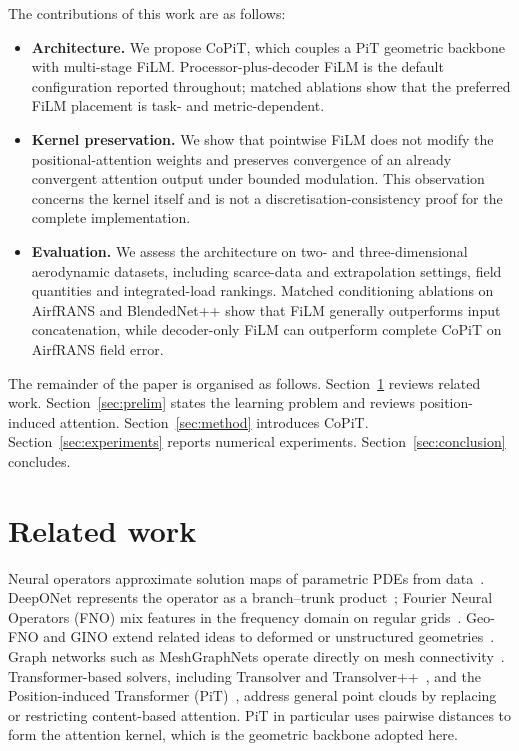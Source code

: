 \documentclass[final,3p,times]{elsarticle}
\begin{document}
The contributions of this work are as follows:
\begin{itemize}[leftmargin=1.4em,itemsep=0.2em,topsep=0.3em]
\item \textbf{Architecture.} We propose CoPiT, which couples a PiT geometric backbone with multi-stage FiLM. Processor-plus-decoder FiLM is the default configuration reported throughout; matched ablations show that the preferred FiLM placement is task- and metric-dependent.
\item \textbf{Kernel preservation.} We show that pointwise FiLM does not modify the positional-attention weights and preserves convergence of an already convergent attention output under bounded modulation. This observation concerns the kernel itself and is not a discretisation-consistency proof for the complete implementation.
\item \textbf{Evaluation.} We assess the architecture on two- and three-dimensional aerodynamic datasets, including scarce-data and extrapolation settings, field quantities and integrated-load rankings. Matched conditioning ablations on AirfRANS and BlendedNet++ show that FiLM generally outperforms input concatenation, while decoder-only FiLM can outperform complete CoPiT on AirfRANS field error.
\end{itemize}

The remainder of the paper is organised as follows. Section~\ref{sec:related} reviews related work. Section~\ref{sec:prelim} states the learning problem and reviews position-induced attention. Section~\ref{sec:method} introduces CoPiT. Section~\ref{sec:experiments} reports numerical experiments. Section~\ref{sec:conclusion} concludes.


\section{Related work}
\label{sec:related}
Neural operators approximate solution maps of parametric PDEs from data~\cite{kovachki2023neural}. DeepONet represents the operator as a branch--trunk product~\cite{lu2021deeponet}; Fourier Neural Operators (FNO) mix features in the frequency domain on regular grids~\cite{li2021fno}. Geo-FNO and GINO extend related ideas to deformed or unstructured geometries~\cite{li2023geofno,li2022gino}. Graph networks such as MeshGraphNets operate directly on mesh connectivity~\cite{pfaff2021learning}. Transformer-based solvers, including Transolver and Transolver++~\cite{wu2024transolver,luo2025transolverpp}, and the Position-induced Transformer (PiT)~\cite{chen2024pit}, address general point clouds by replacing or restricting content-based attention. PiT in particular uses pairwise distances to form the attention kernel, which is the geometric backbone adopted here.
\end{document}
